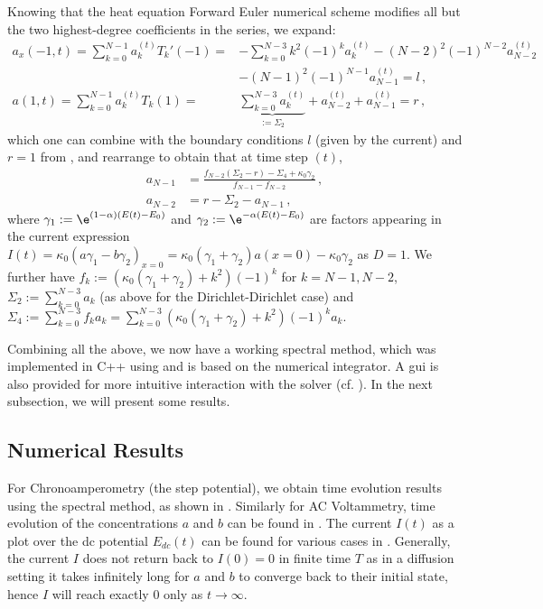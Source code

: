 \documentclass{prettytex/ox/mmsc-special-topic}
\begin{document}
  Knowing that the heat equation Forward Euler numerical scheme modifies all but the two highest-degree coefficients in the series, we expand:
  \begin{align*}
    a_x(-1, t) = \sum_{k=0}^{N-1} a_k^{(t)} T_k'(-1) =   & -\sum_{k=0}^{N-3} k^2 (-1)^{k} a_k^{(t)} - (N-2)^2 (-1)^{N-2} a_{N-2}^{(t)}                                                  \\
                                                         & -(N-1)^2 (-1)^{N-1} a_{N-1}^{(t)} = l\,,                                                                                     \\
    a(1, t)    = \sum_{k=0}^{N-1} a_k^{(t)} T_k(1)     = & \underbrace{\sum_{k=0}^{N-3} a_k^{(t)}}_{:= \Sigma_2}              + a_{N-2}^{(t)}                    + a_{N-1}^{(t)} = r\,,
  \end{align*}
  which one can combine with the boundary conditions $l$ (given by the current) and $r = 1$ from , and rearrange to obtain that at time step ${(t)}$,
  \begin{align}
    a_{N-1} & = \frac{f_{N-2}(\Sigma_2 - r) - \Sigma_4 + \kappa_0 \gamma_2}{f_{N-1} - f_{N-2}}\,, \\
    a_{N-2} & = r - \Sigma_2 - a_{N-1}\,,
  \end{align}
  where $\gamma_1 := \e^{(1-\alpha)(E(t) - E_0)}$ and $\gamma_2 := \e^{-\alpha(E(t) - E_0)}$ are factors appearing in the current expression $I(t) = \kappa_0 \left(a \gamma_1 - b \gamma_2\right)_{x=0} = \kappa_0 (\gamma_1 + \gamma_2) a(x=0) - \kappa_0 \gamma_2$ as $D=1$.
  We further have $f_k := \left(\kappa_0 (\gamma_1 + \gamma_2) + k^2\right)(-1)^k$ for $k = N-1, N-2$, $\Sigma_2 := \sum_{k=0}^{N-3} a_k$ (as above for the Dirichlet-Dirichlet case) and $\Sigma_4 := \sum_{k=0}^{N-3} f_k a_k = \sum_{k=0}^{N-3} \left(\kappa_0 (\gamma_1 + \gamma_2) + k^2\right)(-1)^k a_k$.

  Combining all the above, we now have a working spectral method, which was implemented in C++ using \tschebfun and is based on the \heatfun numerical integrator.
  A \gls{gui} is also provided for more intuitive interaction with the solver (cf. ).
  In the next subsection, we will present some results.

  \subsection{Numerical Results}
  For Chronoamperometry (the step potential), we obtain time evolution results using the spectral method, as shown in .
  Similarly for AC Voltammetry, time evolution of the concentrations $a$ and $b$ can be found in .
  The current $I(t)$ as a plot over the \gls{dc} potential $E_{dc}(t)$ can be found for various cases in .
  Generally, the current $I$ does not return back to $I(0) = 0$ in finite time $T$ as in a diffusion setting it takes infinitely long for $a$ and $b$ to converge back to their initial state, hence $I$ will reach exactly $0$ only as $t \rightarrow \infty$.
\end{document}
